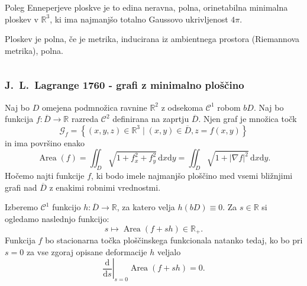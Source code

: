 \documentclass[8pt]{beamer}
\theoremstyle{definition}
\theoremstyle{remark}
\theoremstyle{plain}
\numberwithin{equation}{section}  %
\begin{document}
\begin{frame}
\begin{columns}
\begin{column}{0.5\textwidth}
            Poleg \textcolor{red1}{Enneperjeve ploskve} je to edina neravna, polna, orinetabilna minimalna ploskev v $\mathbb{R}^3$, ki ima najmanjšo totalno Gaussovo ukrivljenost $4\pi$.

            \vspace{0.8em}
            
            Ploskev je \textcolor{red1}{polna}, če je metrika, inducirana iz ambientnega prostora (Riemannova metrika), polna.

        \end{column}
    \end{columns}
\end{frame}

\begin{frame}
    \frametitle{J.~L.~Lagrange 1760 - grafi z minimalno ploščino}

    Naj bo $D$ omejena podmnožica ravnine $\mathbb{R}^2$ z odsekoma $\mathscr{C}^1$ robom $b D$. Naj bo funkcija $f: \overline{D} \rightarrow \mathbb{R}$ razreda $\mathscr{C}^2$ definirana na zaprtju $\overline{D}$. Njen graf je množica točk
    \begin{equation*}
        \mathcal{G}_f=\left\{(x, y, z) \in \mathbb{R}^3 \mid(x, y) \in \overline{D}, z=f(x, y)\right\}    
    \end{equation*}
    in ima površino enako
    \begin{equation*}
        \operatorname{Area}(f)=\iint_{D} \sqrt{1+f_x^2+f_y^2} \, \mathrm{d} x \mathrm{d} y=\iint_{D} \sqrt{1+|\nabla f|^2} \, \mathrm{d} x \mathrm{d} y.    
    \end{equation*}
    Hočemo najti funkcije $f$, ki bodo imele najmanjšo ploščino med vsemi bližnjimi grafi nad $\overline{D}$ z enakimi robnimi vrednostmi.

    \vspace{0.8em}

    Izberemo $\mathscr{C}^1$ funkcijo $h: \overline{D} \rightarrow \mathbb{R}$, za katero velja $h(b D) \equiv 0$. Za $s \in \mathbb{R}$ si ogledamo naslednjo funkcijo:
    \begin{equation*}
        s \longmapsto \operatorname{Area}(f+s h) \in \mathbb{R}_+ .    
    \end{equation*}
    Funkcija $f$ bo stacionarna točka \textcolor{red1}{ploščinskega funkcionala} natanko tedaj, ko bo pri $s=0$ za vse zgoraj opisane deformacije $h$ veljalo
    \begin{equation*}
        \left.\frac{\mathrm{d}}{\mathrm{d} s}\right|_{s=0} \operatorname{Area}(f+s h)=0.    
    \end{equation*}

    
\end{frame}
\end{document}
